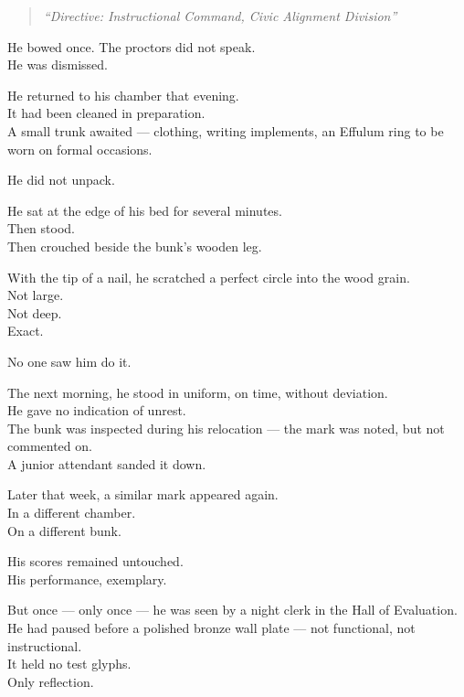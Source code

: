 \documentclass[9pt]{article}
\begin{document}
\begin{quote}
\textit{“Directive: Instructional Command, Civic Alignment Division”}
\end{quote}

He bowed once. The proctors did not speak.\\
He was dismissed.

\vspace{1em}

He returned to his chamber that evening.\\
It had been cleaned in preparation.\\
A small trunk awaited — clothing, writing implements, an Effulum ring to be worn on formal occasions.

He did not unpack.

He sat at the edge of his bed for several minutes.\\
Then stood.\\
Then crouched beside the bunk’s wooden leg.

With the tip of a nail, he scratched a perfect circle into the wood grain.\\
Not large.\\
Not deep.\\
Exact.

\vspace{1em}

No one saw him do it.

The next morning, he stood in uniform, on time, without deviation.\\
He gave no indication of unrest.\\
The bunk was inspected during his relocation — the mark was noted, but not commented on.\\
A junior attendant sanded it down.

Later that week, a similar mark appeared again.\\
In a different chamber.\\
On a different bunk.

\vspace{1em}

His scores remained untouched.\\
His performance, exemplary.

But once — only once — he was seen by a night clerk in the Hall of Evaluation.\\
He had paused before a polished bronze wall plate — not functional, not instructional.\\
It held no test glyphs.\\
Only reflection.
\end{document}
